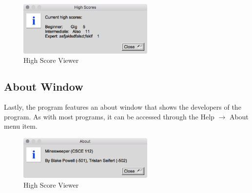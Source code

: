 \documentclass[11pt]{article}
\begin{document}
\begin{figure}[htbp]
   \centering
   \includegraphics[width=0.6\textwidth]{highScores.png}
   \caption{High Score Viewer}
\end{figure}

\subsection{About Window}
Lastly, the program features an about window that shows the developers of the program. As with most programs, it can be accessed through the Help $\rightarrow$ About menu item.

\begin{figure}[htbp]
   \centering
   \includegraphics[width=0.6\textwidth]{about.png}
   \caption{High Score Viewer}
\end{figure}
\end{document}
